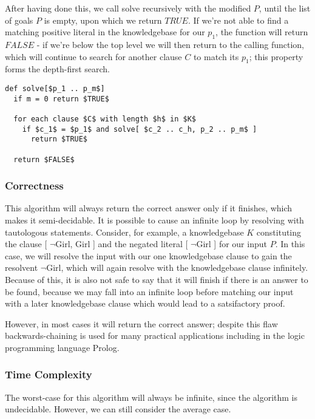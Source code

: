 \documentclass{article}
\begin{document}
After having done this, we call solve recursively with the modified $P$, until
the list of goals $P$ is empty, upon which we return $TRUE$. If we're not able
to find a matching positive literal in the knowledgebase for our $p_1$, the
function will return $FALSE$ - if we're below the top level we will then return
to the calling function, which will continue to search for another clause $C$ to
match its $p_1$; this property forms the depth-first search.

\begin{lstlisting}[mathescape=true]
def solve[$p_1 .. p_m$]
  if m = 0 return $TRUE$

  for each clause $C$ with length $h$ in $K$
    if $c_1$ = $p_1$ and solve[ $c_2 .. c_h, p_2 .. p_m$ ]
      return $TRUE$
  
  return $FALSE$
\end{lstlisting}

\subsubsection{Correctness}

This algorithm will always return the correct answer only if it finishes, which
makes it semi-decidable. It is possible to cause an infinite loop by resolving
with tautologous statements. Consider, for example, a knowledgebase $K$ constituting
the clause [ $\neg$Girl, Girl ] and the negated literal [ $\neg$Girl ] for our
input $P$. In this case, we will resolve the input with our one knowledgebase 
clause to gain the resolvent $\neg$Girl, which will again resolve with the
knowledgebase clause infinitely. Because of this, it is also not safe to say
that it will finish if there is an answer to be found, because we may fall into
an infinite loop before matching our input with a later knowledgebase clause
which would lead to a satsifactory proof.

However, in most cases it will return the correct answer; despite this flaw
backwards-chaining is used for many practical applications including in the
logic programming language Prolog.

\subsubsection{Time Complexity}

The worst-case for this algorithm will always be infinite, since the algorithm
is undecidable. However, we can still consider the average case.
\end{document}
